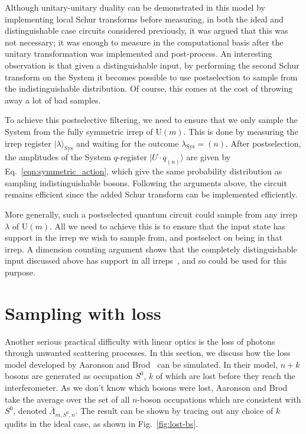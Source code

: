 Although unitary-unitary duality can be demonstrated in this model by implementing local Schur transforms before measuring, in both the ideal and distinguishable case circuits considered previously, it was argued that this was not necessary; it was enough to measure in the computational basis after the unitary transformation was implemented and post-process.
An interesting observation is that given a distinguishable input, by performing the second Schur transform on the System it becomes possible to use postselection to sample from the indistinguishable distribution.
Of course, this comes at the cost of throwing away a lot of bad samples.

To achieve this postselective filtering, we need to ensure that we only sample the System from the fully symmetric irrep of $\textrm{U}(m)$. 
This is done by measuring the irrep register $|\lambda\rangle_{\textrm{Sys}}$ and waiting for the outcome $\lambda_{\textrm{Sys}}=(n)$. 
After postselection, the amplitudes of the System $q$-register $|U\cdot q_{(n)}\rangle$ are given by Eq.~\ref{eqn:symmetric_action}, which give the same probability distribution as sampling indistinguishable bosons. 
Following the arguments above, the circuit remains efficient since the added Schur transform can be implemented efficiently. 

More generally, such a postselected quantum circuit could sample from any irrep $\lambda$ of $\textrm{U}(m)$. 
All we need to achieve this is to ensure that the input state has support in the irrep we wish to sample from, and postselect on being in that irrep.
A dimension counting argument shows that the completely distinguishable input discussed above has support in all irreps~\cite{stanisic2018}, and so could be used for this purpose.



\section{Sampling with loss}
\label{sec:nc-loss}

Another serious practical difficulty with linear optics is the loss of photons through unwanted scattering processes. 
In this section, we discuss how the loss model developed by Aaronson and Brod~\cite{aaronson2015} can be simulated. 
In their model, $n+k$ bosons are generated as occupation $S^0$, $k$ of which are lost before they reach the interferometer. 
As we don't know which bosons were lost, Aaronson and Brod take the average over the set of all $n$-boson occupations which are consistent with $S^0$, denoted $\bar{\Lambda}_{m,S^0,n}$.
The result can be shown by tracing out any choice of $k$ qudits in the ideal case, as shown in Fig.~\ref{fig:lost-bs}. 

